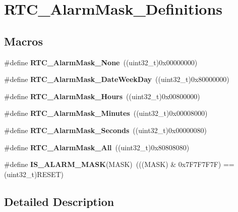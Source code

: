 \hypertarget{group___r_t_c___alarm_mask___definitions}{\section{R\-T\-C\-\_\-\-Alarm\-Mask\-\_\-\-Definitions}
\label{group___r_t_c___alarm_mask___definitions}
}
\subsection*{Macros}
\begin{DoxyCompactItemize}
\item 
\hypertarget{group___r_t_c___alarm_mask___definitions_ga64ab58463d1595424151b6043f5c9650}{\#define {\bfseries R\-T\-C\-\_\-\-Alarm\-Mask\-\_\-\-None}~((uint32\-\_\-t)0x00000000)}\label{group___r_t_c___alarm_mask___definitions_ga64ab58463d1595424151b6043f5c9650}

\item 
\hypertarget{group___r_t_c___alarm_mask___definitions_gae172289e90e0b7ffaebc1fab3183d8f6}{\#define {\bfseries R\-T\-C\-\_\-\-Alarm\-Mask\-\_\-\-Date\-Week\-Day}~((uint32\-\_\-t)0x80000000)}\label{group___r_t_c___alarm_mask___definitions_gae172289e90e0b7ffaebc1fab3183d8f6}

\item 
\hypertarget{group___r_t_c___alarm_mask___definitions_ga458d363397ba3c1b7bc77543b32f0e7b}{\#define {\bfseries R\-T\-C\-\_\-\-Alarm\-Mask\-\_\-\-Hours}~((uint32\-\_\-t)0x00800000)}\label{group___r_t_c___alarm_mask___definitions_ga458d363397ba3c1b7bc77543b32f0e7b}

\item 
\hypertarget{group___r_t_c___alarm_mask___definitions_gad9433880f20b69b62ac8fe35e133b205}{\#define {\bfseries R\-T\-C\-\_\-\-Alarm\-Mask\-\_\-\-Minutes}~((uint32\-\_\-t)0x00008000)}\label{group___r_t_c___alarm_mask___definitions_gad9433880f20b69b62ac8fe35e133b205}

\item 
\hypertarget{group___r_t_c___alarm_mask___definitions_ga8e70c31ba21d8504d2c1e8d6f7929c14}{\#define {\bfseries R\-T\-C\-\_\-\-Alarm\-Mask\-\_\-\-Seconds}~((uint32\-\_\-t)0x00000080)}\label{group___r_t_c___alarm_mask___definitions_ga8e70c31ba21d8504d2c1e8d6f7929c14}

\item 
\hypertarget{group___r_t_c___alarm_mask___definitions_gacbb8cfb5a883b02dd2c025f0745f9bdf}{\#define {\bfseries R\-T\-C\-\_\-\-Alarm\-Mask\-\_\-\-All}~((uint32\-\_\-t)0x80808080)}\label{group___r_t_c___alarm_mask___definitions_gacbb8cfb5a883b02dd2c025f0745f9bdf}

\item 
\hypertarget{group___r_t_c___alarm_mask___definitions_gac119b97b072bf9c12e008011ff202a19}{\#define {\bfseries I\-S\-\_\-\-A\-L\-A\-R\-M\-\_\-\-M\-A\-S\-K}(M\-A\-S\-K)~(((M\-A\-S\-K) \& 0x7\-F7\-F7\-F7\-F) == (uint32\-\_\-t)\-R\-E\-S\-E\-T)}\label{group___r_t_c___alarm_mask___definitions_gac119b97b072bf9c12e008011ff202a19}

\end{DoxyCompactItemize}


\subsection{Detailed Description}
